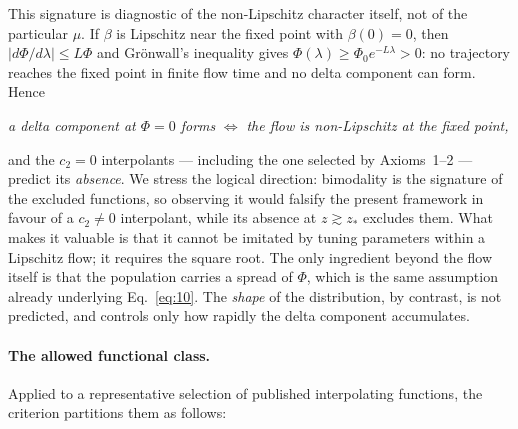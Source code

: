 \documentclass[11pt]{article}
\theoremstyle{plain}
\begin{document}
This signature is diagnostic of the non-Lipschitz character itself, not of the
particular $\mu$. If $\beta$ is Lipschitz near the fixed point with
$\beta(0)=0$, then $|d\Phi/d\lambda|\le L\Phi$ and Gr\"onwall's inequality gives
$\Phi(\lambda)\ge\Phi_{0}e^{-L\lambda}>0$: no trajectory reaches the fixed point
in finite flow time and no delta component can form. Hence
\begin{center}
\emph{a delta component at $\Phi=0$ forms} $\iff$ \emph{the flow is non-Lipschitz at the
fixed point,}
\end{center}
and the $c_{2}=0$ interpolants --- including the one selected by Axioms~1--2 ---
predict its \emph{absence}. We stress the logical direction: bimodality is the
signature of the excluded functions, so observing it would falsify the present
framework in favour of a $c_{2}\neq0$ interpolant, while its absence at
$z\gtrsim z_{*}$ excludes them. What makes it valuable is that it cannot be
imitated by tuning parameters within a Lipschitz flow; it requires the square
root. The only ingredient beyond the flow itself is that the population carries
a spread of $\Phi$, which is the same assumption already underlying
Eq.~\eqref{eq:10}. The \emph{shape} of the distribution, by contrast, is not
predicted, and controls only how rapidly the delta component accumulates.

\paragraph{The allowed functional class.} Applied to a representative selection
of published interpolating functions, the criterion partitions them as follows:
\end{document}

